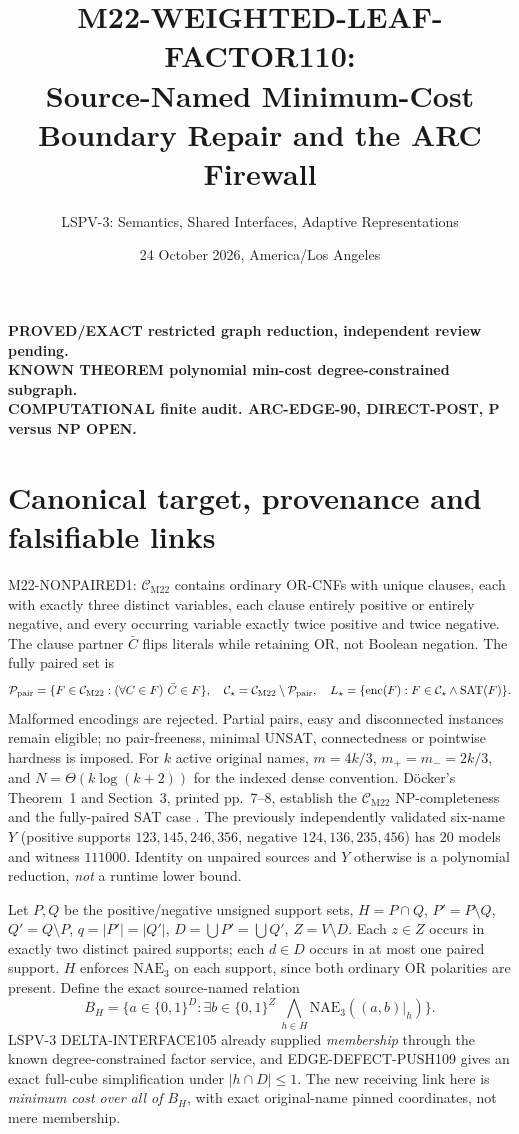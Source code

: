 \documentclass[11pt]{article}
\title{M22-WEIGHTED-LEAF-FACTOR110:\\ Source-Named Minimum-Cost Boundary Repair and the ARC Firewall}
\author{LSPV-3: Semantics, Shared Interfaces, Adaptive Representations}
\date{24 October 2026, America/Los Angeles}
\newcommand{\CM}{\mathcal C_{\mathrm{M22}}}
\newcommand{\CS}{\mathcal C_\star}
\newcommand{\SAT}{\operatorname{SAT}}
\begin{document}
\maketitle
\begin{center}
\textbf{PROVED/EXACT restricted graph reduction, independent review pending.}\\
\textbf{KNOWN THEOREM polynomial min-cost degree-constrained subgraph.}\\
\textbf{COMPUTATIONAL finite audit. ARC-EDGE-90, DIRECT-POST, P versus NP OPEN.}
\end{center}

\section{Canonical target, provenance and falsifiable links}
M22-NONPAIRED1: $\CM$ contains ordinary OR-CNFs with unique clauses, each with exactly three distinct variables, each clause entirely positive or entirely negative, and every occurring variable exactly twice positive and twice negative. The clause partner $\bar C$ flips literals while retaining OR, not Boolean negation. The fully paired set is
\[
{\cal P}_{\mathrm{pair}}=\{F\in\CM:(\forall C\in F)\ \bar C\in F\},
\quad \CS=\CM\setminus{\cal P}_{\mathrm{pair}},\quad
L_\star=\{\operatorname{enc}(F):F\in\CS\wedge\SAT(F)\}.
\]
Malformed encodings are rejected. Partial pairs, easy and disconnected instances remain eligible; no pair-freeness, minimal UNSAT, connectedness or pointwise hardness is imposed. For $k$ active original names, $m=4k/3$, $m_+=m_-=2k/3$, and $N=\Theta(k\log(k+2))$ for the indexed dense convention. D\"ocker's Theorem~1 and Section~3, printed pp.~7--8, establish the $\CM$ NP-completeness and the fully-paired SAT case \cite{docker}. The previously independently validated six-name $Y$ (positive supports $123,145,246,356$, negative $124,136,235,456$) has $20$ models and witness $111000$. Identity on unpaired sources and $Y$ otherwise is a polynomial reduction, \emph{not} a runtime lower bound.

Let $P,Q$ be the positive/negative unsigned support sets, $H=P\cap Q$, $P'=P\setminus Q$, $Q'=Q\setminus P$, $q=|P'|=|Q'|$, $D=\bigcup P'=\bigcup Q'$, $Z=V\setminus D$. Each $z\in Z$ occurs in exactly two distinct paired supports; each $d\in D$ occurs in at most one paired support. $H$ enforces $\mathrm{NAE}_3$ on each support, since both ordinary OR polarities are present. Define the exact source-named relation
\[
 B_H=\{a\in\{0,1\}^{D}:\exists b\in\{0,1\}^{Z}\ \bigwedge_{h\in H}\mathrm{NAE}_3((a,b)|_h)\}.
\]
LSPV-3 DELTA-INTERFACE105 already supplied \emph{membership} through the known degree-constrained factor service, and EDGE-DEFECT-PUSH109 gives an exact full-cube simplification under $|h\cap D|\le1$. The new receiving link here is \emph{minimum cost over all of $B_H$}, with exact original-name pinned coordinates, not mere membership.
\end{document}
